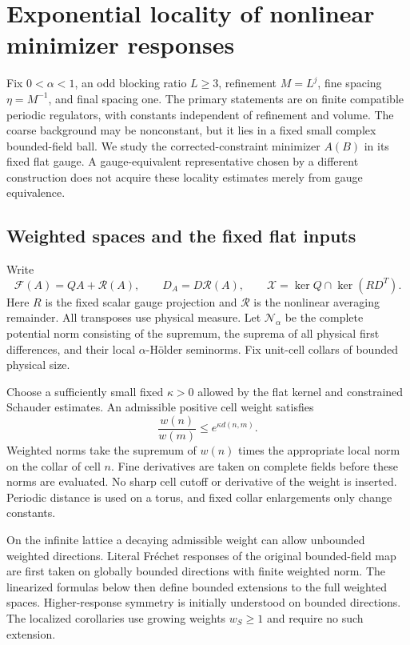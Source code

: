 
\section{Exponential locality of nonlinear minimizer responses}
\label{wr-section}

Fix $0<\alpha<1$, an odd blocking ratio $L\ge3$, refinement
$M=L^j$, fine spacing $\eta=M^{-1}$, and final spacing one.
The primary statements are on finite compatible periodic
regulators, with constants independent of refinement and volume.
The coarse background may be nonconstant, but it lies in a fixed
small complex bounded-field ball. We study the corrected-constraint
minimizer $A(B)$ in its fixed flat gauge. A gauge-equivalent
representative chosen by a different construction does not acquire
these locality estimates merely from gauge equivalence.

\subsection{Weighted spaces and the fixed flat inputs}
\label{wr-spaces}

Write
\[
 \mathcal F(A)=QA+\mathcal R(A),\qquad
 D_A=D\mathcal R(A),\qquad
 \mathcal X=\ker Q\cap\ker(RD^T).
\]
Here $R$ is the fixed scalar gauge projection and
$\mathcal R$ is the nonlinear averaging remainder. All transposes
use physical measure. Let $\mathcal N_\alpha$ be the complete
potential norm consisting of the supremum, the suprema of all
physical first differences, and their local $\alpha$-H\"older
seminorms. Fix unit-cell collars of bounded physical size.

Choose a sufficiently small fixed $\kappa>0$ allowed by the flat
kernel and constrained Schauder estimates. An admissible positive
cell weight satisfies
\begin{equation}\label{wr-weight}
 \frac{w(n)}{w(m)}\le e^{\kappa d(n,m)}.
\end{equation}
Weighted norms take the supremum of $w(n)$ times the appropriate
local norm on the collar of cell $n$. Fine derivatives are taken
on complete fields before these norms are evaluated. No sharp cell
cutoff or derivative of the weight is inserted. Periodic distance
is used on a torus, and fixed collar enlargements only change
constants.

On the infinite lattice a decaying admissible weight can allow
unbounded weighted directions. Literal Fr\'echet responses of the
original bounded-field map are first taken on globally bounded
directions with finite weighted norm. The linearized formulas
below then define bounded extensions to the full weighted spaces.
Higher-response symmetry is initially understood on bounded
directions. The localized corollaries use growing weights
$w_S\ge1$ and require no such extension.

